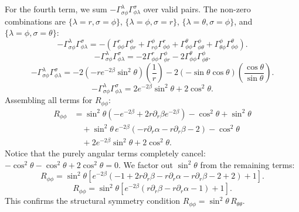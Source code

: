 \documentclass[11pt, a4paper]{report}
\begin{document}
For the fourth term, we sum $-\Gamma^\lambda_{\sigma\phi} \Gamma^\sigma_{\phi\lambda}$ over valid pairs. The non-zero combinations are $\{\lambda=r, \sigma=\phi\}$, $\{\lambda=\phi, \sigma=r\}$, $\{\lambda=\theta, \sigma=\phi\}$, and $\{\lambda=\phi, \sigma=\theta\}$:
\begin{equation}
-\Gamma^\lambda_{\sigma\phi} \Gamma^\sigma_{\phi\lambda} = -\left( \Gamma^r_{\phi\phi} \Gamma^\phi_{\phi r} + \Gamma^\phi_{r\phi} \Gamma^r_{\phi\phi} + \Gamma^\theta_{\phi\phi} \Gamma^\phi_{\phi\theta} + \Gamma^\phi_{\theta\phi} \Gamma^\theta_{\phi\phi} \right).
\end{equation}
\begin{equation}
-\Gamma^\lambda_{\sigma\phi} \Gamma^\sigma_{\phi\lambda} = -2\Gamma^r_{\phi\phi} \Gamma^\phi_{\phi r} - 2\Gamma^\theta_{\phi\phi} \Gamma^\phi_{\phi\theta}.
\end{equation}
\begin{equation}
-\Gamma^\lambda_{\sigma\phi} \Gamma^\sigma_{\phi\lambda} = -2\left( -re^{-2\beta}\sin^2\theta \right)\left(\frac{1}{r}\right) - 2\left(-\sin\theta\cos\theta\right)\left(\frac{\cos\theta}{\sin\theta}\right).
\end{equation}
\begin{equation}
-\Gamma^\lambda_{\sigma\phi} \Gamma^\sigma_{\phi\lambda} = 2e^{-2\beta}\sin^2\theta + 2\cos^2\theta.
\end{equation}
Assembling all terms for $R_{\phi\phi}$:
\begin{align}
R_{\phi\phi} &= \sin^2\theta \left( -e^{-2\beta} + 2r\partial_r\beta e^{-2\beta} \right) - \cos^2\theta + \sin^2\theta \nonumber \\
&\quad + \sin^2\theta \, e^{-2\beta} \left( -r\partial_r\alpha - r\partial_r\beta - 2 \right) - \cos^2\theta \nonumber \\
&\quad + 2e^{-2\beta}\sin^2\theta + 2\cos^2\theta.
\end{align}
Notice that the purely angular terms completely cancel: $-\cos^2\theta - \cos^2\theta + 2\cos^2\theta = 0$. We factor out $\sin^2\theta$ from the remaining terms:
\begin{equation}
R_{\phi\phi} = \sin^2\theta \left[ e^{-2\beta} \left( -1 + 2r\partial_r\beta - r\partial_r\alpha - r\partial_r\beta - 2 + 2 \right) + 1 \right].
\end{equation}
\begin{equation}
R_{\phi\phi} = \sin^2\theta \left[ e^{-2\beta} \left( r\partial_r\beta - r\partial_r\alpha - 1 \right) + 1 \right].
\end{equation}
This confirms the structural symmetry condition $R_{\phi\phi} = \sin^2\theta \, R_{\theta\theta}$.
\end{document}
